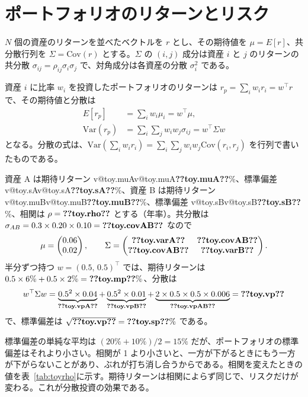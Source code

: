 \documentclass[xelatex,ja=standard,jafont=hiragino-pron,a4paper,11pt,openany]{bxjsreport}
\makeatletter
\newcommand{\V}[1]{\ifcsname v@#1\endcsname\csname v@#1\endcsname\else\textbf{??#1??}\fi}
\newcommand{\T}{^{\top}}
\newcommand{\tabref}[1]{表~\ref{#1}}
\makeatother
\begin{document}
\section{ポートフォリオのリターンとリスク}

$N$ 個の資産のリターンを並べたベクトルを $r$ とし、その期待値を $\mu = E[r]$、共分散行列を $\Sigma = \mathrm{Cov}(r)$ とする。$\Sigma$ の $(i,j)$ 成分は資産 $i$ と $j$ のリターンの共分散 $\sigma_{ij} = \rho_{ij}\sigma_i\sigma_j$ で、対角成分は各資産の分散 $\sigma_i^2$ である。

資産 $i$ に比率 $w_i$ を投資したポートフォリオのリターンは $r_p = \sum_i w_i r_i = w\T r$ で、その期待値と分散は
\begin{align}
E[r_p] &= \sum_i w_i \mu_i = w\T\mu, \label{eq:pmean}\\
\mathrm{Var}(r_p) &= \sum_i\sum_j w_i w_j \sigma_{ij} = w\T\Sigma w \label{eq:pvar}
\end{align}
となる。分散の式は、$\mathrm{Var}(\sum_i w_i r_i) = \sum_i \sum_j w_i w_j \mathrm{Cov}(r_i, r_j)$ を行列で書いたものである。

\begin{exbox}
資産 A は期待リターン \V{toy.muA}\%、標準偏差 \V{toy.sA}\%、資産 B は期待リターン \V{toy.muB}\%、標準偏差 \V{toy.sB}\%、相関は $\rho = \V{toy.rho}$ とする（年率）。共分散は $\sigma_{AB} = 0.3 \times 0.20 \times 0.10 = \V{toy.covAB}$ なので
\[
\mu = \begin{pmatrix} 0.06 \\ 0.02 \end{pmatrix},\qquad
\Sigma = \begin{pmatrix} \V{toy.varA} & \V{toy.covAB} \\ \V{toy.covAB} & \V{toy.varB} \end{pmatrix}.
\]
半分ずつ持つ $w = (0.5,\,0.5)\T$ では、期待リターンは $0.5 \times 6\% + 0.5 \times 2\% = \V{toy.mp}\%$、分散は
\[
w\T\Sigma w = \underbrace{0.5^2 \times 0.04}_{\V{toy.vpA}} + \underbrace{0.5^2 \times 0.01}_{\V{toy.vpB}} + \underbrace{2 \times 0.5 \times 0.5 \times 0.006}_{\V{toy.vpAB}} = \V{toy.vp}
\]
で、標準偏差は $\sqrt{\V{toy.vp}} = \V{toy.sp}\%$ である。
\end{exbox}

標準偏差の単純な平均は $(20\% + 10\%)/2 = 15\%$ だが、ポートフォリオの標準偏差はそれより小さい。相関が 1 より小さいと、一方が下がるときにもう一方が下がらないことがあり、ぶれが打ち消し合うからである。相関を変えたときの値を\tabref{tab:toyrho}に示す。期待リターンは相関によらず同じで、リスクだけが変わる。これが分散投資の効果である。
\end{document}
